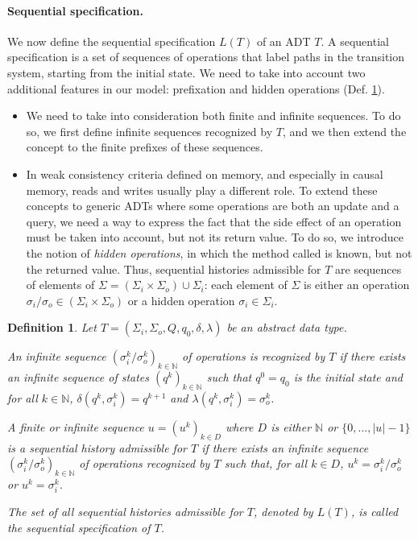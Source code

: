 \documentclass[9pt,numbers]{sigplanconf}
\newtheorem{definition}{Definition}
\begin{document}
\paragraph{Sequential specification.}
We now define the sequential specification $L(T)$ of an ADT $T$. A sequential specification is a set 
of sequences of operations that label paths in the transition system, starting from the initial state. 
We need to take into account two additional features in our model: prefixation and hidden operations (Def. \ref{def:L(T)}).
\begin{itemize}
\item We need to take into consideration both finite and infinite sequences. To do so, we first define infinite
  sequences recognized by $T$, and we then extend the concept to the finite prefixes of these sequences.
\item In weak consistency criteria defined on memory, and especially in causal memory, reads and writes 
  usually play a different role. To extend these concepts to generic ADTs where some operations are both
  an update and a query, we need a way to express the fact that the side effect of an operation must be 
  taken into account, but not its return value. To do so, we introduce the notion of \emph{hidden operations},
  in which the method called is known, but not the returned value. Thus, sequential histories admissible 
  for $T$ are sequences of elements of $\Sigma = (\Sigma_i\times \Sigma_o) \cup \Sigma_i$: each element of $\Sigma$ is 
  either an operation $\sigma_i/\sigma_o \in (\Sigma_i\times \Sigma_o)$ or a hidden operation $\sigma_i \in \Sigma_i$.
\end{itemize}

\begin{definition}\label{def:L(T)}
  Let $T = (\Sigma_i, \Sigma_o, Q, q_0, \delta, \lambda)$ be an abstract data type.

  An infinite sequence $(\sigma_i^k/\sigma_o^k)_{k\in \mathbb{N}}$ of operations is \emph{recognized by $T$} if 
  there exists an infinite sequence of states $(q^k)_{k\in \mathbb{N}}$ such that $q^0 = q_0$ is the initial state 
  and for all $k\in \mathbb{N}$, $\delta(q^k, \sigma_i^k) = q^{k+1}$ and $\lambda(q^k, \sigma_i^k) = \sigma_o^k$. 

  
  A finite or infinite sequence $u = (u^k)_{k\in D}$ where $D$ is either $\mathbb{N}$ or $\{0, ..., |u|-1\}$ is a 
  \emph{sequential history admissible for $T$} if there exists an infinite sequence $(\sigma_i^k/\sigma_o^k)_{k\in \mathbb{N}}$ of operations recognized by $T$
  such that, for all $k\in D$, $u^k = \sigma_i^k/\sigma_o^k$ or $u^k = \sigma_i^k$.
  
  The set of all sequential histories admissible for $T$, denoted by $L(T)$, is called the \emph{sequential specification} of $T$.
\end{definition}
\end{document}
